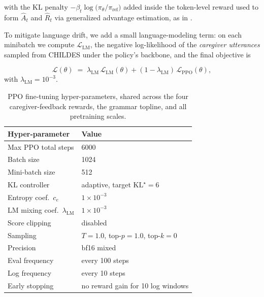 with the KL penalty $-\beta_t \log\!\big(\pi_\theta / \pi_{\text{ref}}\big)$
added inside the token-level reward used to form $\hat{A}_t$ and $\hat{R}_t$ via generalized advantage estimation, as in \citet{vonwerra2020trl}. 


To mitigate language drift, we add a small language-modeling term: on each minibatch we compute
$\mathcal{L}_{\text{LM}}$, the negative log-likelihood of the \emph{caregiver utterances} sampled from CHILDES under the policy's backbone, and the final objective is

\begin{equation}
\label{eq:final-loss}
\mathcal{L}(\theta) \;=\; \lambda_{\text{LM}}\, \mathcal{L}_{\text{LM}}(\theta)
+ (1 - \lambda_{\text{LM}})\, \mathcal{L}_{\text{PPO}}(\theta),
\end{equation}
with $\lambda_{\text{LM}} = 10^{-3}$.




\fi
\begin{table}[t]
\centering
\small
\begin{tabular}{ll}
\toprule
\textbf{Hyper-parameter} & \textbf{Value} \\
\midrule
Max PPO total steps                 & 6000 \\
Batch size                       & 1024 \\
Mini-batch size                  & 512 \\
KL controller                    & adaptive, target $\text{KL}^\star=6$ \\
Entropy coef.\ $c_e$             & $1\times10^{-3}$ \\
LM mixing coef.\ $\lambda_{\text{LM}}$ & $1\times10^{-3}$ \\
Score clipping                   & disabled \\
Sampling                         & $T{=}1.0$, top-$p{=}1.0$, top-$k{=}0$ \\
Precision                        & bf16 mixed \\
Eval frequency                   & every 100 steps \\
Log frequency                    & every 10 steps \\
Early stopping                   & no reward gain for 10 log windows \\
\bottomrule
\end{tabular}
\caption{PPO fine-tuning hyper-parameters, shared across the four caregiver-feedback rewards, the grammar topline, and all pretraining scales.}
\label{tab:ppo-hparams}
\end{table}







